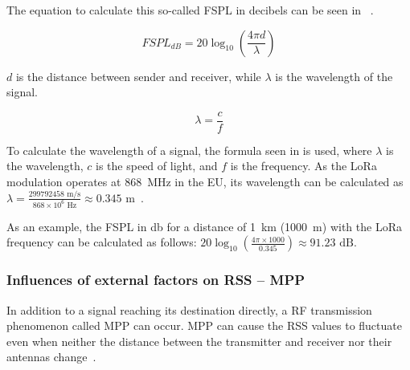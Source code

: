 The equation to calculate this so-called \acl{FSPL} in decibels can be seen in ~\cite[p. 1321]{whitaker_electronics_1996}.

\begin{equation}\label{eq:fspl}
    FSPL_{dB} = 20 \log_{10}\left(\frac{4 \pi d}{\lambda}\right)
\end{equation}

$d$ is the distance between sender and receiver, while $\lambda$ is the wavelength of the signal.

\begin{equation}\label{eq:wavelength-of-a-signal}
    \lambda = \frac{c}{f}
\end{equation}

To calculate the wavelength of a signal, the formula seen in  is used, where $\lambda$ is the wavelength, $c$ is the speed of light, and $f$ is the frequency.
As the \ac{LoRa} modulation operates at \SI{868}{\mega\hertz} in the \ac{EU}, its wavelength can be calculated as $\lambda = \frac{299792458 \text{ m/s}}{868 \times 10^6 \text{ Hz}} \approx 0.345 \text{ m}$~\cite{lora_alliance_inc_lorawan_regional_2017}.

As an example, the \acl{FSPL} in \si{\decibel} for a distance of \SI{1}{\kilo\metre} (\SI{1000}{\metre}) with the \ac{LoRa} frequency can be calculated as follows: $20 \log_{10}\left(\frac{4 \pi \times 1000}{0.345}\right) \approx 91.23 \text{ dB}$.

\subsubsection{Influences of external factors on \acs{RSS} – \acl{MPP}}\label{sec:multipath-propagation}

In addition to a signal reaching its destination directly, a \ac{RF} transmission phenomenon called \acf{MPP} can occur.
\acl{MPP} can cause the \ac{RSS} values to fluctuate even when neither the distance between the transmitter and receiver nor their antennas change~\cite[p. 136]{abdelfadeel_how_2019}.

